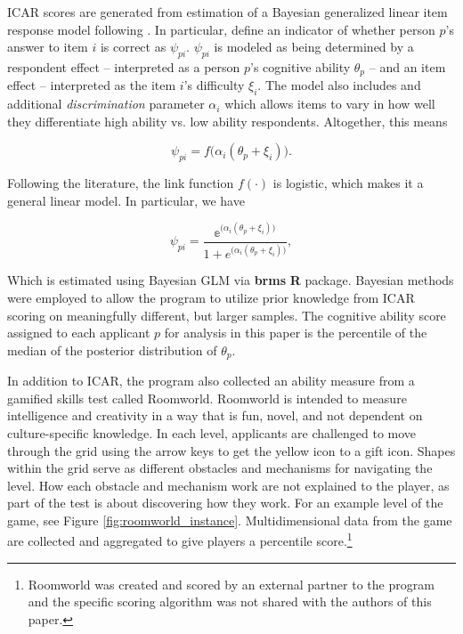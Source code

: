 ICAR scores are generated from estimation of a Bayesian generalized linear item response model following . In particular, define an indicator of whether person $p$'s answer to item $i$ is correct as $\psi_{pi}$. $\psi_{pi}$ is modeled as being determined by a respondent effect -- interpreted as a person $p$'s cognitive ability $\theta_p$ -- and an item effect -- interpreted as the item $i$'s difficulty $\xi_i$. The model also includes and additional \emph{discrimination} parameter $\alpha_i$ which allows items to vary in how well they differentiate high ability vs. low ability respondents. Altogether, this means 

\begin{equation}
\psi_{pi} = f\big(\alpha_i(\theta_p + \xi_i)\big). \nonumber
\end{equation}

Following the literature, the link function $f(\cdot)$ is logistic, which makes it a general linear model. In particular, we have

\begin{equation}
\psi_{pi} = \frac{\mathbb{e}^{\big(\alpha_i(\theta_p + \xi_i)\big)}}{1 + e^{\big(\alpha_i(\theta_p + \xi_i)\big)}}, \nonumber
\end{equation}

Which is estimated using Bayesian GLM via \textbf{brms} \textbf{R} package. Bayesian methods were employed to allow the program to utilize prior knowledge from ICAR scoring on meaningfully different, but larger samples. The cognitive ability score assigned to each applicant $p$ for analysis in this paper is the percentile of the median of the posterior distribution of $\theta_p$.

In addition to ICAR, the program also collected an ability measure from a gamified skills test called Roomworld. Roomworld is intended to measure intelligence and creativity in a way that is fun, novel, and not dependent on culture-specific knowledge. In each level, applicants are challenged to move through the grid using the arrow keys to get the yellow icon to a gift icon. Shapes within the grid serve as different obstacles and mechanisms for navigating the level. How each obstacle and mechanism work are not explained to the player, as part of the test is about discovering how they work. For an example level of the game, see Figure \ref{fig:roomworld_instance}. Multidimensional data from the game are collected and aggregated to give players a percentile score.\footnote{Roomworld was created and scored by an external partner to the program and the specific scoring algorithm was not shared with the authors of this paper.}
 

